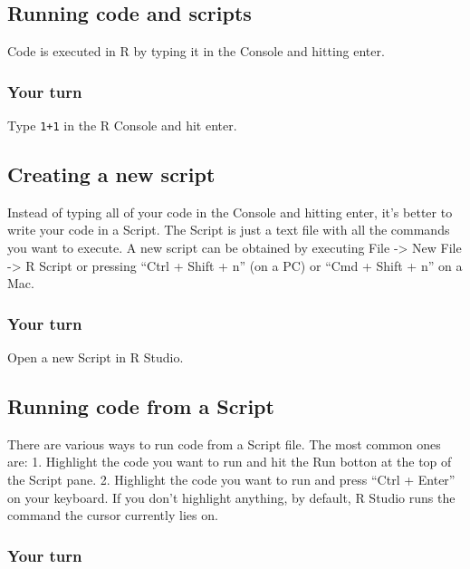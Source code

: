 \documentclass[
]{article}
\begin{document}
\hypertarget{running-code-and-scripts}{%
\subsection{Running code and scripts}\label{running-code-and-scripts}}

Code is executed in R by typing it in the Console and hitting enter.

\hypertarget{your-turn}{%
\subsubsection{Your turn}\label{your-turn}}

Type \texttt{1+1} in the R Console and hit enter.

\hypertarget{creating-a-new-script}{%
\subsection{Creating a new script}\label{creating-a-new-script}}

Instead of typing all of your code in the Console and hitting enter,
it's better to write your code in a Script. The Script is just a text
file with all the commands you want to execute. A new script can be
obtained by executing File -\textgreater{} New File -\textgreater{} R
Script or pressing ``Ctrl + Shift + n'' (on a PC) or ``Cmd + Shift + n''
on a Mac.

\hypertarget{your-turn-1}{%
\subsubsection{Your turn}\label{your-turn-1}}

Open a new Script in R Studio.

\hypertarget{running-code-from-a-script}{%
\subsection{Running code from a
Script}\label{running-code-from-a-script}}

There are various ways to run code from a Script file. The most common
ones are: 1. Highlight the code you want to run and hit the Run botton
at the top of the Script pane. 2. Highlight the code you want to run and
press ``Ctrl + Enter'' on your keyboard. If you don't highlight
anything, by default, R Studio runs the command the cursor currently
lies on.

\hypertarget{your-turn-2}{%
\subsubsection{Your turn}\label{your-turn-2}}
\end{document}
